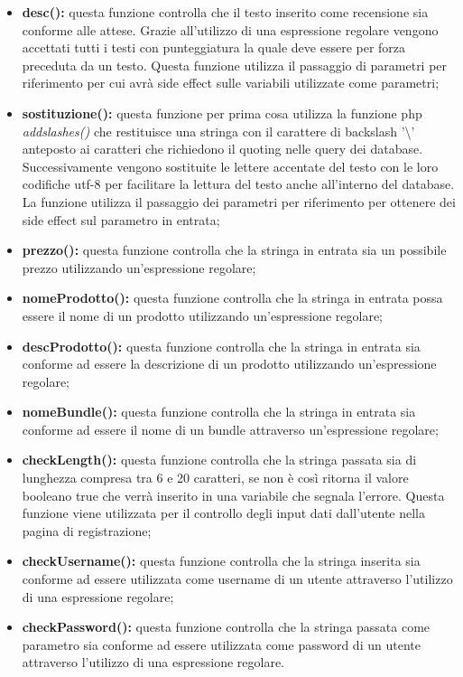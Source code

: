 \begin{itemize}
    \item \textbf{desc():} questa funzione controlla che il testo inserito come recensione sia conforme alle attese. Grazie all'utilizzo di una espressione regolare vengono accettati tutti i testi con punteggiatura la quale deve essere per forza preceduta da un testo.\newline
    Questa funzione utilizza il passaggio di parametri per riferimento per cui avrà side effect sulle variabili utilizzate come parametri;
    
    
    \item \textbf{sostituzione():} questa funzione per prima cosa utilizza la funzione php \emph{addslashes()} che restituisce una stringa con il carattere di backslash '\textbackslash' anteposto ai caratteri che richiedono il quoting nelle query dei database.
    Successivamente vengono sostituite le lettere accentate del testo con le loro codifiche utf-8 per facilitare la lettura del testo anche all'interno del database.
    La funzione utilizza il passaggio dei parametri per riferimento per ottenere dei side effect sul parametro in entrata;
    
    \item \textbf{prezzo():} questa funzione controlla che la stringa in entrata sia un possibile prezzo utilizzando un'espressione regolare;
    
    \item \textbf{nomeProdotto():} questa funzione controlla che la stringa in entrata possa essere il nome di un prodotto utilizzando un'espressione regolare;
    
    \item \textbf{descProdotto():} questa funzione controlla che la stringa in entrata sia conforme ad essere la descrizione di un prodotto utilizzando un'espressione regolare;
    
    \item \textbf{nomeBundle():} questa funzione controlla che la stringa in entrata sia conforme ad essere il nome di un bundle attraverso un'espressione regolare;
    
    \item \textbf{checkLength():} questa funzione controlla che la stringa passata sia di lunghezza compresa tra 6 e 20 caratteri,
    se non è così ritorna il valore booleano true che verrà inserito in una variabile che segnala l'errore.
    Questa funzione viene utilizzata per il controllo degli input dati dall'utente nella pagina di registrazione;
    
    \item \textbf{checkUsername():} questa funzione controlla che la stringa inserita sia conforme ad essere utilizzata come username di un utente attraverso l'utilizzo di una espressione regolare;

   \item \textbf{checkPassword():} questa funzione controlla che la stringa passata come parametro sia conforme ad essere utilizzata come password di un utente attraverso l'utilizzo di una espressione regolare.

\end{itemize}

